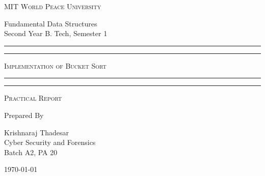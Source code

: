 \documentclass[11pt]{article}
\begin{document}
\begin{titlepage}
	\centering


	\huge\textsc{
		MIT World Peace University
	}\\

	\vspace{0.75\baselineskip} %

	\LARGE{
		Fundamental Data Structures\\
		Second Year B. Tech, Semester 1
	}

	\vfill %


	\rule{\textwidth}{1.6pt}\vspace*{-\baselineskip}\vspace*{2pt}
	\rule{\textwidth}{0.6pt}
	\vspace{0.75\baselineskip} %



	\huge{\textsc{
			Implementation of Bucket Sort
		}} \\



	\vspace{0.5\baselineskip} %
	\rule{\textwidth}{0.6pt}\vspace*{-\baselineskip}\vspace*{2.8pt}
	\rule{\textwidth}{1.6pt}

	\vspace{1\baselineskip} %


	\LARGE\textsc{
		Practical Report
	} %
	\vfill


	Prepared By
	\vspace{0.5\baselineskip} %

	\Large{
		Krishnaraj Thadesar \\
		Cyber Security and Forensics\\
		Batch A2, PA 20
	}


	\vspace{0.5\baselineskip} %
	\today

\end{titlepage}
\end{document}
